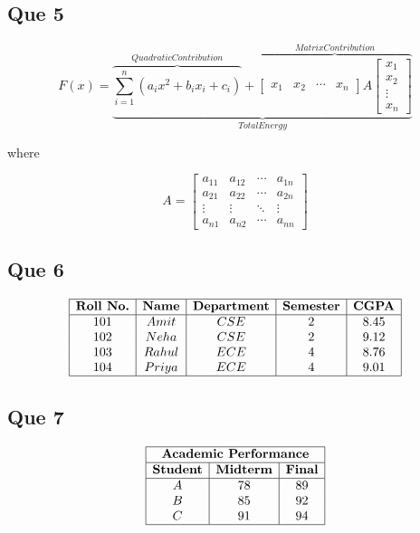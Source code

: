 \documentclass[12pt,a4paper]{article}
\begin{document}
	\subsection*{Que 5}
	\[
		F(x)=\underbrace{\overbrace{\sum_{i=1}^{n}(a_ix^2+b_ix_i+c_i)}^{Quadratic Contribution}+\overbrace{
			\begin{bmatrix}
				x_1&x_2&\cdots&x_n
			\end{bmatrix}A
			\begin{bmatrix}
				x_1\\
				x_2\\
				\vdots\\
				x_n
			\end{bmatrix}
			}^{Matrix Contribution}}_{Total Energy}
	\]
	
	where
	
	\[
	A=
	\begin{bmatrix}
		a_{11}&a_{12}&\cdots&a_{1n}\\
		a_{21}&a_{22}&\cdots&a_{2n}\\
		\vdots&\vdots&\ddots&\vdots\\
		a_{n1}&a_{n2}&\cdots&a_{nn}
	\end{bmatrix}
	\]
	
	\subsection*{Que 6}
	
	\[
	\begin{array}{|c|c|c|c|c|}
		\hline
		\textbf{Roll No.} & \textbf{Name} & \textbf{Department} &
		\textbf{Semester} & \textbf{CGPA}\\
		\hline
		101 & Amit & CSE & 2 & 8.45\\
		102 & Neha & CSE & 2 & 9.12\\
		103 & Rahul & ECE & 4 & 8.76\\
		104 & Priya & ECE & 4 & 9.01\\
		\hline
	\end{array}
	\]
	
	\subsection*{Que 7}
	
	\[
	\begin{array}{|c|c|c|}
		\hline
		\multicolumn{3}{|c|}{\textbf{Academic Performance}}\\
		\hline
		\textbf{Student} & \textbf{Midterm} & \textbf{Final}\\
		\hline
		A & 78 & 89\\
		B & 85 & 92\\
		C & 91 & 94\\
		\hline
	\end{array}
	\]
	
\end{document}

